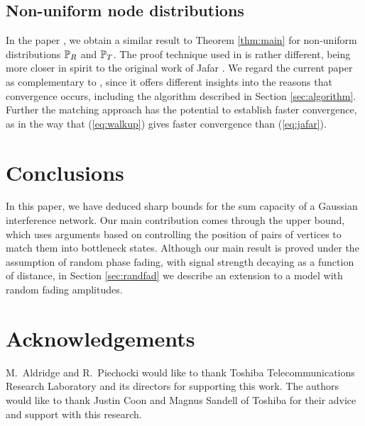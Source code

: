 \documentclass[journal]{IEEEtran}
\begin{document}
\subsection{Non-uniform node distributions} \label{sec:non-unif}
%
In the paper \cite{johnsonc7},
we obtain a similar result to Theorem \ref{thm:main} for
 non-uniform distributions ${\mathbb {P}}_R$ and ${\mathbb {P}}_T$. The proof 
technique used in \cite{johnsonc7} is rather different, being more closer
in spirit to the original work of Jafar \cite{jafar}. 
We regard the current paper as complementary to \cite{johnsonc7}, 
since it offers different insights into the reasons that convergence
occurs, including the algorithm described in Section \ref{sec:algorithm}.
 Further the matching
approach has the potential to establish faster convergence,
as in the way that (\ref{eq:walkup}) gives faster convergence than
(\ref{eq:jafar}).
%
\section{Conclusions}
%
In this paper, we have 
deduced sharp bounds for the sum capacity
of a Gaussian interference  network.
Our main contribution comes
through the upper bound, which uses arguments based on controlling 
the position of pairs of vertices to
match them
into bottleneck states. Although our main result is proved under
the assumption of random phase fading, with signal strength decaying as a function of distance,
in Section \ref{sec:randfad} we describe an extension to a model
with random fading amplitudes.

\section*{Acknowledgements}
%
M.~Aldridge and R.~Piechocki would like to thank Toshiba Telecommunications Research
Laboratory and its directors for supporting this work.
The authors would like to thank Justin Coon and Magnus Sandell of Toshiba for
their advice and support with this research.
%
\end{document}
